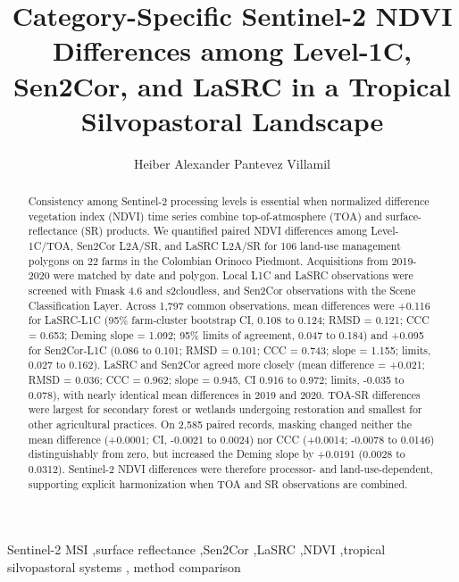 \documentclass[
  authoryear,
  preprint]{elsarticle}
\begin{document}
\begin{frontmatter}
\title{Category-Specific Sentinel-2 NDVI Differences among Level-1C,
Sen2Cor, and LaSRC in a Tropical Silvopastoral Landscape}
\author[1,2]{Heiber Alexander Pantevez Villamil%
%
}



        
\begin{abstract}
Consistency among Sentinel-2 processing levels is essential when
normalized difference vegetation index (NDVI) time series combine
top-of-atmosphere (TOA) and surface-reflectance (SR) products. We
quantified paired NDVI differences among Level-1C/TOA, Sen2Cor L2A/SR,
and LaSRC L2A/SR for 106 land-use management polygons on 22 farms in the
Colombian Orinoco Piedmont. Acquisitions from 2019-2020 were matched by
date and polygon. Local L1C and LaSRC observations were screened with
Fmask 4.6 and s2cloudless, and Sen2Cor observations with the Scene
Classification Layer. Across 1,797 common observations, mean differences
were +0.116 for LaSRC-L1C (95\% farm-cluster bootstrap CI, 0.108 to
0.124; RMSD = 0.121; CCC = 0.653; Deming slope = 1.092; 95\% limits of
agreement, 0.047 to 0.184) and +0.095 for Sen2Cor-L1C (0.086 to 0.101;
RMSD = 0.101; CCC = 0.743; slope = 1.155; limits, 0.027 to 0.162). LaSRC
and Sen2Cor agreed more closely (mean difference = +0.021; RMSD = 0.036;
CCC = 0.962; slope = 0.945, CI 0.916 to 0.972; limits, -0.035 to 0.078),
with nearly identical mean differences in 2019 and 2020. TOA-SR
differences were largest for secondary forest or wetlands undergoing
restoration and smallest for other agricultural practices. On 2,585
paired records, masking changed neither the mean difference (+0.0001;
CI, -0.0021 to 0.0024) nor CCC (+0.0014; -0.0078 to 0.0146)
distinguishably from zero, but increased the Deming slope by +0.0191
(0.0028 to 0.0312). Sentinel-2 NDVI differences were therefore
processor- and land-use-dependent, supporting explicit harmonization
when TOA and SR observations are combined.
\end{abstract}





\begin{keyword}
    Sentinel-2 MSI \sep surface
reflectance \sep Sen2Cor \sep LaSRC \sep NDVI \sep tropical
silvopastoral systems \sep 
    method comparison
\end{keyword}
\end{frontmatter}
    
\end{document}
